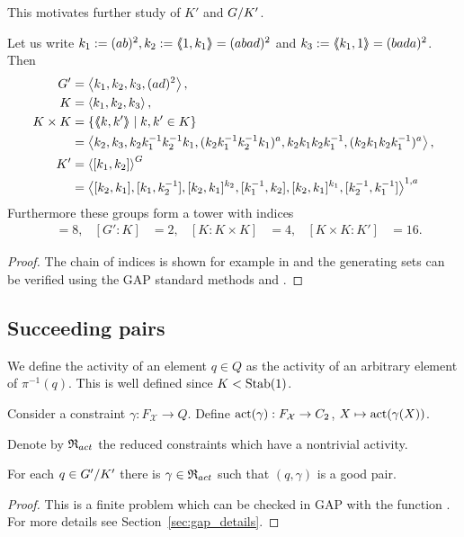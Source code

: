 \documentclass[a4paper,11pt]{amsart}
\begin{document}
This motivates further study of $K'$ and ${G/K'}$.
\begin{lem} \label{lem:subgroupsOfG}
Let us write $k_1 := (ab)^2, k_2:=\langle\negthickspace\langle1,k_1\rangle\negthickspace\rangle = (abad)^2$ and $k_3:=\langle\negthickspace\langle k_1,1\rangle\negthickspace\rangle = (bada)^2$. Then 
 \begin{align*}
  G' &= \left< k_1,k_2,k_3,(ad)^2\right>, \\
  K &= \left< k_1,k_2,k_3\right>, \\
  K\times K &= \{\langle\negthickspace\langle k,k'\rangle\negthickspace\rangle \mid k,k'\in K\} \\&= \left< k_2,k_3,k_2k_1^{-1}k_2^{-1}k_1,(k_2k_1^{-1}k_2^{-1}k_1)^a,k_2k_1k_2k_1^{-1},(k_2k_1k_2k_1^{-1})^a  \right>,\\
  K' &= \left< [k_1,k_2] \right>^G \\ 
  &= \left<[k_2,k_1],[k_1,k_2^{-1}],[k_2,k_1]^{k_2},[k_1^{-1},k_2], [k_2,k_1]^{k_1},[k_2^{-1},k_1^{-1}]\right>^{1,a} 
 \end{align*}
Furthermore these groups form a tower with indices
\begin{align*}
  [G:G']&=8, & [G':K]&=2, &[K:K\times K]&= 4, &[K\times K:K']&=16. 
\end{align*}
\end{lem}
\begin{proof}
 The chain of indices is shown for example in \cite{Bartholdi:BranchGroups} 
 and the generating sets can be verified using the GAP standard methods
  and . 
\end{proof}

\subsection{Succeeding pairs}
\begin{defi}
 We define the activity of an element $q\in Q$ as the activity of an arbitrary element of $\pi^{-1}(q)$. 
 This is well defined since $K<\operatorname{Stab}(1)$. 
 
 Consider a constraint $\gamma\colon F_{\mathcal{X}} \to Q$. 
 Define $\operatorname{act}(\gamma): F_{\mathcal{X}}\to C_2$, $X \mapsto \operatorname{act}(\gamma(X))$.
 
 Denote by $\mathfrak{R}_{act}$ the reduced constraints which have a nontrivial activity.
\end{defi}

\begin{lem} \label{lem:existsGoodGamma}
 For each $q\in{G'/K'}$ there is $\gamma\in \mathfrak{R}_{act}$ such that $(q,\gamma)$ is a 
 good pair.
\end{lem}
\begin{proof}
 This is a finite problem which can be checked in GAP with the function .
 For more details see Section~\ref{sec:gap_details}.
\end{proof}
\end{document}
